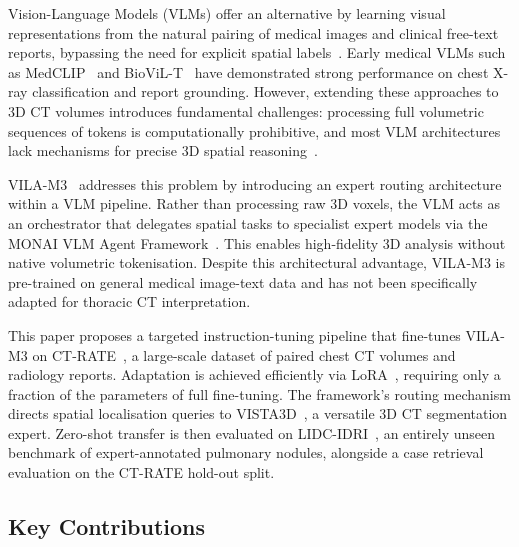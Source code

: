 \documentclass{iopconfser}
\begin{document}
Vision-Language Models (VLMs) offer an alternative by learning visual
representations from the natural pairing of medical images and clinical
free-text reports, bypassing the need for explicit spatial labels~\cite{clip2021,
medclip2022}. Early medical VLMs such as MedCLIP~\cite{medclip2022} and
BioViL-T~\cite{biovilt2023} have demonstrated strong performance on chest X-ray
classification and report grounding. However, extending these approaches to 3D CT
volumes introduces fundamental challenges: processing full volumetric sequences of
tokens is computationally prohibitive, and most VLM architectures lack mechanisms
for precise 3D spatial reasoning~\cite{vilaM32024}.

VILA-M3~\cite{vilaM32024} addresses this problem by introducing an expert routing
architecture within a VLM pipeline. Rather than processing raw 3D voxels, the VLM
acts as an orchestrator that delegates spatial tasks to specialist expert models via
the MONAI VLM Agent Framework~\cite{monai2022}. This enables high-fidelity 3D
analysis without native volumetric tokenisation. Despite this architectural
advantage, VILA-M3 is pre-trained on general medical image-text data and has not
been specifically adapted for thoracic CT interpretation.

This paper proposes a targeted instruction-tuning pipeline that fine-tunes VILA-M3
on CT-RATE~\cite{ctrate2024}, a large-scale dataset of paired chest CT volumes and
radiology reports. Adaptation is achieved efficiently via LoRA~\cite{lora2022},
requiring only a fraction of the parameters of full fine-tuning. The framework's
routing mechanism directs spatial localisation queries to VISTA3D~\cite{vista3d2024},
a versatile 3D CT segmentation expert. Zero-shot transfer is then evaluated on
LIDC-IDRI~\cite{lidc2011}, an entirely unseen benchmark of expert-annotated
pulmonary nodules, alongside a case retrieval evaluation on the CT-RATE hold-out
split.

\subsection*{Key Contributions}
\end{document}
